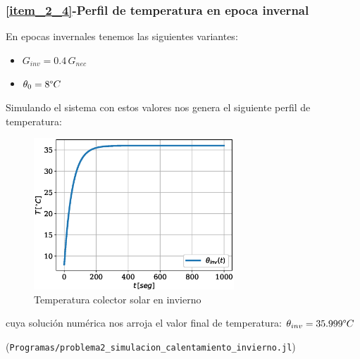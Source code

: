 \subsubsection{\ref{item_2_4}-Perfil de temperatura en epoca invernal}
En epocas invernales tenemos las siguientes variantes:

\begin{itemize}
   \item $G_{inv}=0.4\,G_{nec}$
   \item $\theta_{0} = 8 \degree C$
\end{itemize}
Simulando el sistema con estos valores nos genera el siguiente perfil de temperatura:

\begin{figure}[H]
   \centering
   \includegraphics[width=0.67\textwidth]{Images/temperatura_colector_invierno.eps}
   \caption{Temperatura colector solar en invierno}\label{fig:colector_temperatura_invierno}
\end{figure}

cuya solución numérica nos arroja el valor final de temperatura: $\theta_{inv} = 35.999 \degree C$

(\verb|Programas/problema2_simulacion_calentamiento_invierno.jl|)


